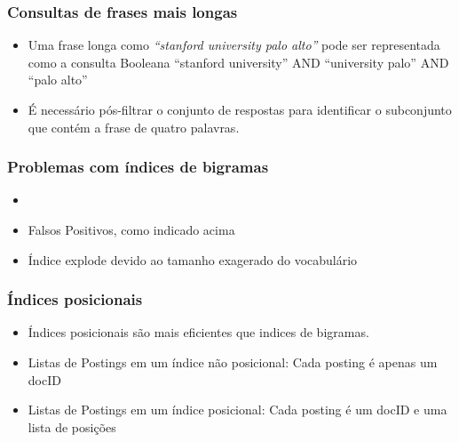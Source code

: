 \documentclass[compress]{beamer}
\def\term#1{{\sc #1}}   %
\def\oper#1{{\sc #1}} %
\begin{document}
\begin{frame}
\frametitle{Consultas de frases mais longas}
\begin{itemize}[<+->]
\item Uma frase longa como \emph{``stanford university palo
  alto''} pode ser representada como a consulta Booleana 
\term{``stanford university''}
\oper{AND}
\term{``university palo''}
\oper{AND}
\term{``palo alto''}
\item É necessário pós-filtrar o conjunto de respostas para identificar o 
subconjunto que contém a frase de quatro palavras.
\end{itemize}
\end{frame}

\begin{frame}
\frametitle{Problemas com índices de bigramas}
\begin{itemize}[<+->]
\item {}
\item Falsos Positivos, como indicado acima
\item Índice explode devido ao tamanho exagerado do vocabulário
\end{itemize}
\end{frame}

\begin{frame}[<+->]
\frametitle{Índices posicionais}
\pause[2]
\begin{itemize}
\item Índices posicionais são mais eficientes que indices de bigramas.
\item Listas de Postings em um índice {\color{blue}não posicional}: Cada 
posting é apenas um docID
\item Listas de Postings em um índice {\color{blue} posicional}: Cada 
posting é um docID e {\color{blue} uma lista de posições}

\end{itemize}

\end{frame}
\end{document}
